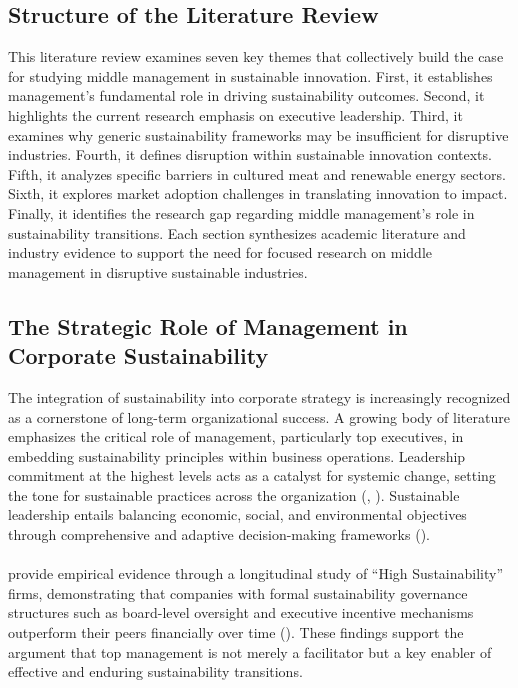 	\subsection*{Structure of the Literature Review}
	This literature review examines seven key themes that collectively build the case for studying middle management in sustainable innovation. First, it establishes management’s fundamental role in driving sustainability outcomes. Second, it highlights the current research emphasis on executive leadership. Third, it examines why generic sustainability frameworks may be insufficient for disruptive industries. Fourth, it defines disruption within sustainable innovation contexts. Fifth, it analyzes specific barriers in cultured meat and renewable energy sectors. Sixth, it explores market adoption challenges in translating innovation to impact. Finally, it identifies the research gap regarding middle management’s role in sustainability transitions. Each section synthesizes academic literature and industry evidence to support the need for focused research on middle management in disruptive sustainable industries.
	
	\subsection{The Strategic Role of Management in Corporate Sustainability}
	The integration of sustainability into corporate strategy is increasingly recognized as a cornerstone of long-term organizational success. A growing body of literature emphasizes the critical role of management, particularly top executives, in embedding sustainability principles within business operations. Leadership commitment at the highest levels acts as a catalyst for systemic change, setting the tone for sustainable practices across the organization (\textcite{Avery2005}, \textcite{Waldman2008}). Sustainable leadership entails balancing economic, social, and environmental objectives through comprehensive and adaptive decision-making frameworks (\textcite{Lozano2015}).
	
	\paragraph*{} \citeauthor{Eccles2014} provide empirical evidence through a longitudinal study of “High Sustainability” firms, demonstrating that companies with formal sustainability governance structures such as board-level oversight and executive incentive mechanisms outperform their peers financially over time (\textcite{Eccles2014}). These findings support the argument that top management is not merely a facilitator but a key enabler of effective and enduring sustainability transitions.
	
